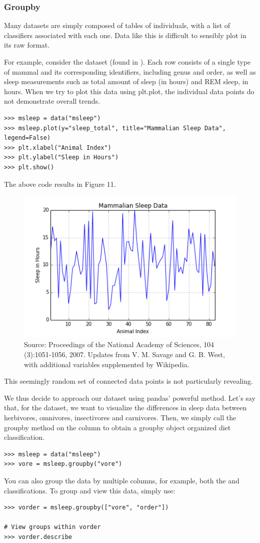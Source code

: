 \subsubsection*{Groupby}
Many datasets are simply composed of tables of individuals, with a list of classifiers associated with each one.
Data like this is difficult to sensibly plot in its raw format.

For example, consider the  dataset (found in ). 
Each row consists of a single type of mammal and its corresponding identifiers, including genus and order, as well as sleep measurements such as total amount of sleep (in hours) and REM sleep, in hours.
When we try to plot this data using plt.plot, the individual data points do not demonstrate overall trends.
\begin{lstlisting}
>>> msleep = data("msleep")
>>> msleep.plot(y="sleep_total", title="Mammalian Sleep Data", legend=False)
>>> plt.xlabel("Animal Index")
>>> plt.ylabel("Sleep in Hours")
>>> plt.show()
\end{lstlisting}
The above code results in Figure 11.
\begin{figure}[H] 
    \centering
    \includegraphics[width=.75\textwidth]{Msleep1.png}
    \caption{Source:  Proceedings of the National Academy of Sciences, 104 (3):1051-1056, 2007. Updates from V. M. Savage and G. B. West, with additional variables supplemented by Wikipedia.}
    \label{fig:aplot}
\end{figure}
This seemingly random set of connected data points is not particularly revealing.

We thus decide to approach our dataset using pandas' powerful  method. 
Let's say that, for the  dataset, we want to visualize the differences in sleep data between herbivores, omnivores, insectivores and carnivores.
Then, we simply call the groupby method on the  column to obtain a groupby object organized diet classification.
\begin{lstlisting}
>>> msleep = data("msleep")
>>> vore = msleep.groupby("vore")
\end{lstlisting}
You can also group the data by multiple columns, for example, both the  and  classifications.
To group and view this data, simply use:
\begin{lstlisting}
>>> vorder = msleep.groupby(["vore", "order"])

# View groups within vorder
>>> vorder.describe
\end{lstlisting}

